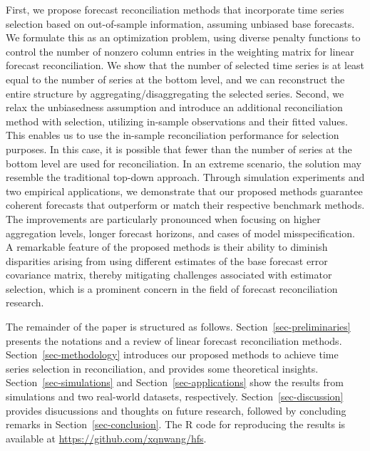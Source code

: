 \documentclass[
  11pt]{article}
\theoremstyle{plain}
\theoremstyle{remark}
\begin{document}
First, we propose forecast reconciliation methods that incorporate time
series selection based on out-of-sample information, assuming unbiased
base forecasts. We formulate this as an optimization problem, using
diverse penalty functions to control the number of nonzero column
entries in the weighting matrix for linear forecast reconciliation. We
show that the number of selected time series is at least equal to the
number of series at the bottom level, and we can reconstruct the entire
structure by aggregating/disaggregating the selected series. Second, we
relax the unbiasedness assumption and introduce an additional
reconciliation method with selection, utilizing in-sample observations
and their fitted values. This enables us to use the in-sample
reconciliation performance for selection purposes. In this case, it is
possible that fewer than the number of series at the bottom level are
used for reconciliation. In an extreme scenario, the solution may
resemble the traditional top-down approach. Through simulation
experiments and two empirical applications, we demonstrate that our
proposed methods guarantee coherent forecasts that outperform or match
their respective benchmark methods.
 The improvements are particularly
pronounced when focusing on higher aggregation levels, longer forecast
horizons, and cases of model misspecification. A remarkable feature of
the proposed methods is their ability to diminish disparities arising
from using different estimates of the base forecast error covariance
matrix, thereby mitigating challenges associated with estimator
selection, which is a prominent concern in the field of forecast
reconciliation research.

The remainder of the paper is structured as follows.
Section~\ref{sec-preliminaries} presents the notations and a review of
linear forecast reconciliation methods. Section~\ref{sec-methodology}
introduces our proposed methods to achieve time series selection in
reconciliation, and provides some theoretical insights.
Section~\ref{sec-simulations} and Section~\ref{sec-applications} show
the results from simulations and two real-world datasets, respectively.
Section~\ref{sec-discussion} provides disucussions and thoughts on
future research, followed by concluding remarks in
Section~\ref{sec-conclusion}. The R code for reproducing the results is
available at \url{https://github.com/xqnwang/hfs}.
\end{document}
